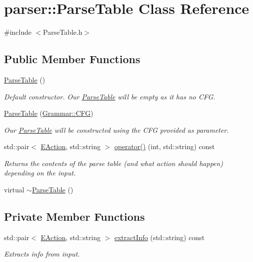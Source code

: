 \hypertarget{classparser_1_1ParseTable}{\section{parser\-:\-:\-Parse\-Table \-Class \-Reference}
\label{d6/d64/classparser_1_1ParseTable}
}


{\ttfamily \#include $<$\-Parse\-Table.\-h$>$}

\subsection*{\-Public \-Member \-Functions}
\begin{DoxyCompactItemize}
\item 
\hyperlink{classparser_1_1ParseTable_a00ed64dc142ed6ff9418bec52ae3db04}{\-Parse\-Table} ()
\begin{DoxyCompactList}\small\item\em \-Default constructor. \-Our \hyperlink{classparser_1_1ParseTable}{\-Parse\-Table} will be empty as it has no \-C\-F\-G. \end{DoxyCompactList}\item 
\hyperlink{classparser_1_1ParseTable_a421c3ed6e27aacf66b2c783b5309bc85}{\-Parse\-Table} (\hyperlink{classGrammar_1_1CFG}{\-Grammar\-::\-C\-F\-G})
\begin{DoxyCompactList}\small\item\em \-Our \hyperlink{classparser_1_1ParseTable}{\-Parse\-Table} will be constructed using the \-C\-F\-G provided as parameter. \end{DoxyCompactList}\item 
std\-::pair$<$ \hyperlink{namespaceparser_a7a838229f5b5b20f185dfad9d362dbed}{\-E\-Action}, std\-::string $>$ \hyperlink{classparser_1_1ParseTable_a26500ede234e76d28fcc6bef9198b71a}{operator()} (int, std\-::string) const 
\begin{DoxyCompactList}\small\item\em \-Returns the contents of the parse table (and what action should happen) depending on the input. \end{DoxyCompactList}\item 
virtual \hyperlink{classparser_1_1ParseTable_a9879c15d87bea61cdfbf3e58151e57d3}{$\sim$\-Parse\-Table} ()
\end{DoxyCompactItemize}
\subsection*{\-Private \-Member \-Functions}
\begin{DoxyCompactItemize}
\item 
std\-::pair$<$ \hyperlink{namespaceparser_a7a838229f5b5b20f185dfad9d362dbed}{\-E\-Action}, std\-::string $>$ \hyperlink{classparser_1_1ParseTable_aa82b236a735f2f0b9aff02273c9c96a8}{extract\-Info} (std\-::string) const 
\begin{DoxyCompactList}\small\item\em \-Extracts info from input. \end{DoxyCompactList}\end{DoxyCompactItemize}
